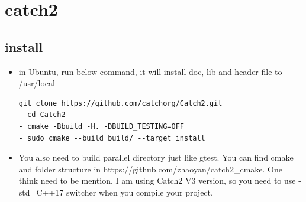 \documentclass[a4paper,11pt,twoside]{book}
\begin{document}
\section{catch2}
\subsection{install}

\begin{itemize}
	
	\item in Ubuntu, run below command, it will install doc, lib and header file to /usr/local
	
\begin{lstlisting}
git clone https://github.com/catchorg/Catch2.git
- cd Catch2
- cmake -Bbuild -H. -DBUILD_TESTING=OFF
- sudo cmake --build build/ --target install
\end{lstlisting}

	\item You also need to build parallel directory just like gtest. You can find cmake and folder structure in https://github.com/zhaoyan/catch2\_cmake.  One think need to be mention, I am using Catch2 V3 version, so you need to use -std=C++17 switcher when you compile your project. 
	
\end{itemize}
	
\end{document}
